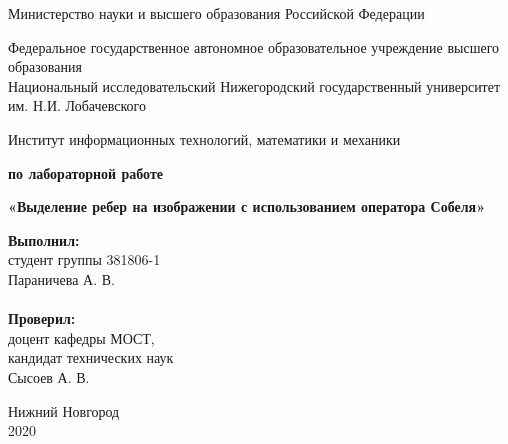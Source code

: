 \documentclass{report}
\begin{document}
	\begin{titlepage}

		\begin{center}
			Министерство науки и высшего образования Российской Федерации
		\end{center}

		\begin{center}
			Федеральное государственное автономное образовательное учреждение высшего образования \\
			Национальный исследовательский Нижегородский государственный университет им. Н.И. Лобачевского
		\end{center}

		\begin{center}
			Институт информационных технологий, математики и механики
		\end{center}

		\vspace{4em}

		\begin{center}
			\textbf{ по лабораторной работе} \\
		\end{center}
		\begin{center}
			\textbf{\Large«Выделение ребер на изображении с использованием оператора Собеля»} \\
		\end{center}

		\vspace{4em}

		\newbox{\lbox}
		\newlength{\maxl}
		\setlength{\maxl}{\wd\lbox}
		\hfill\parbox{7cm}{
			\hspace*{5cm}\hspace*{-5cm}\textbf{Выполнил:} \\ студент группы 381806-1 \\ Параничева А. В.\\
			\\
			\hspace*{5cm}\hspace*{-5cm}\textbf{Проверил:}\\ доцент кафедры МОСТ, \\ кандидат технических наук \\ Сысоев А. В.\\
		}
		\vspace{\fill}

		\begin{center} Нижний Новгород \\ 2020 \end{center}

	\end{titlepage}
\end{document}

